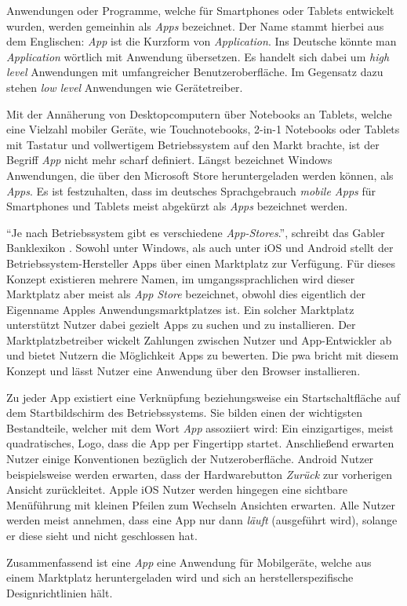 Anwendungen oder Programme, welche für Smartphones oder Tablets entwickelt wurden, werden gemeinhin als \textit{Apps} bezeichnet. Der Name stammt hierbei aus dem Englischen: \textit{App} ist die Kurzform von \textit{Application}. Ins Deutsche könnte man \textit{Application} wörtlich mit Anwendung übersetzen. \cite{BegriffApp} Es handelt sich dabei um \textit{high level} Anwendungen mit umfangreicher Benutzeroberfläche. Im Gegensatz dazu stehen \textit{low level} Anwendungen wie Gerätetreiber.

Mit der Annäherung von Desktopcomputern über Notebooks an Tablets, welche eine Vielzahl mobiler Geräte, wie Touchnotebooks, 2-in-1 Notebooks oder Tablets mit Tastatur und vollwertigem Betriebssystem auf den Markt brachte, ist der Begriff \textit{App} nicht mehr scharf definiert.
Längst bezeichnet Windows Anwendungen, die über den Microsoft Store heruntergeladen werden können, als \textit{Apps}. Es ist festzuhalten, dass im deutsches Sprachgebrauch \textit{mobile Apps} für Smartphones und Tablets meist abgekürzt als \textit{Apps} bezeichnet werden.

``Je nach Betriebssystem gibt es verschiedene \textit{App-Stores}.'', schreibt das Gabler Banklexikon \cite{BegriffAppGabler}. Sowohl unter Windows, als auch unter iOS und Android stellt der Betriebssystem-Hersteller Apps über einen Marktplatz zur Verfügung. Für dieses Konzept existieren mehrere Namen, im umgangssprachlichen wird dieser Marktplatz aber meist als \textit{App Store} bezeichnet, obwohl dies eigentlich der Eigenname Apples Anwendungsmarktplatzes ist. 
Ein solcher Marktplatz unterstützt Nutzer dabei gezielt Apps zu suchen und zu installieren. Der Marktplatzbetreiber wickelt Zahlungen zwischen Nutzer und App-Entwickler ab und bietet Nutzern die Möglichkeit Apps zu bewerten. 
Die \acf{pwa} bricht mit diesem Konzept und lässt Nutzer eine Anwendung über den Browser installieren. 

Zu jeder App existiert eine Verknüpfung beziehungsweise ein Startschaltfläche auf dem Startbildschirm des Betriebssystems. Sie bilden einen der wichtigsten Bestandteile, welcher mit dem Wort \textit{App} assoziiert wird: Ein einzigartiges, meist quadratisches, Logo, dass die App per Fingertipp startet. Anschließend erwarten Nutzer einige Konventionen bezüglich der Nutzeroberfläche. Android Nutzer beispielsweise werden erwarten, dass der Hardwarebutton \textit{Zurück} zur vorherigen Ansicht zurückleitet. Apple iOS Nutzer werden hingegen eine sichtbare Menüführung mit kleinen Pfeilen zum Wechseln Ansichten erwarten. Alle Nutzer werden meist annehmen, dass eine App nur dann \textit{läuft} (ausgeführt wird), solange er diese sieht und nicht geschlossen hat.

Zusammenfassend ist eine \textit{App} eine Anwendung für Mobilgeräte, welche aus einem Marktplatz heruntergeladen wird und sich an herstellerspezifische Designrichtlinien hält.